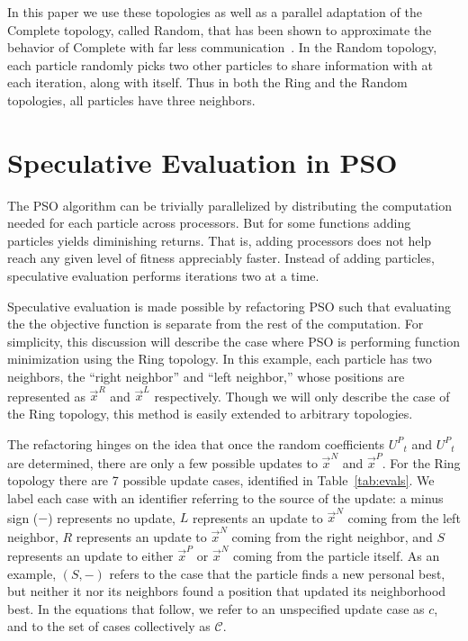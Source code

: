 \documentclass{llncs}
\providecommand{\pers}{\ensuremath{P}}
\providecommand{\neigh}{\ensuremath{N}}
\providecommand{\leftind}{\ensuremath{L}}
\providecommand{\rightind}{\ensuremath{R}}
\providecommand{\pURand}{\ensuremath{U^\pers}}
\providecommand{\nbest}{\ensuremath{\Vec{x}^\neigh}}
\providecommand{\pbest}{\ensuremath{\Vec{x}^\pers}}
\providecommand{\leftn}{\ensuremath{\Vec{x}^\leftind}}
\providecommand{\rightn}{\ensuremath{\Vec{x}^\rightind}}
\providecommand{\caseset}{\ensuremath{\mathcal{C}}}
\providecommand{\casegen}{\ensuremath{c}}
\providecommand{\casexn}{\ensuremath{(S,-)}}
\begin{document}
In this paper we use these topologies as well as a parallel adaptation of the
Complete topology, called Random, that has been shown to approximate the
behavior of Complete with far less
communication~\cite{mcnabb-2009-large-particle-swarms}.  In the Random
topology, each particle randomly picks two other particles to share information
with at each iteration, along with itself.  Thus in both the Ring and the
Random topologies, all particles have three neighbors.

\section{Speculative Evaluation in PSO}
\label{sec:sepso}

The PSO algorithm can be trivially parallelized by distributing the computation
needed for each particle across processors.  But for some functions adding
particles yields diminishing returns.  That is, adding processors does not help
reach any given level of fitness appreciably faster.  Instead of adding
particles, speculative evaluation performs iterations two at a time.

Speculative evaluation is made possible by refactoring
PSO such that evaluating the
the objective function is separate from the rest of the computation.  For
simplicity, this discussion will describe the case where PSO is performing
function minimization using the Ring topology.  In this example, each particle
has two neighbors, the ``right neighbor'' and ``left neighbor,'' whose
positions are represented as $\rightn$ and $\leftn$ respectively.  Though we
will only describe the case of the Ring topology, this method is easily
extended to arbitrary topologies.

The refactoring hinges on the idea that once the random coefficients $\pURand_{t}$ and $\pURand_{t}$ are
determined, there are only a few possible updates to $\nbest$ and $\pbest$.
For the Ring topology there are 7 possible update cases, identified in
Table~\ref{tab:evals}.  We label each case with an identifier referring to the
source of the update: a minus sign ($-$) represents no update, $L$ represents
an update to $\nbest$ coming from the left neighbor, $R$ represents an update
to $\nbest$ coming from the right neighbor, and $S$ represents an update to
either $\pbest$ or $\nbest$ coming from the particle itself.  As an example,
$\casexn$ refers to the case that the particle finds a new personal best, but
neither it nor its neighbors found a position that updated its neighborhood
best.  In the equations that follow, we refer to an unspecified update case as
$\casegen$, and to the set of cases collectively as $\caseset$.
\end{document}
